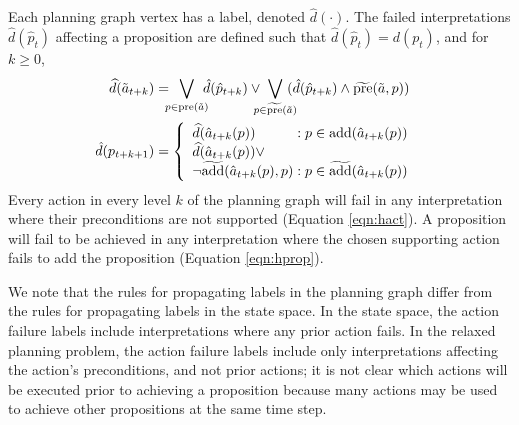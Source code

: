 \documentclass[letterpaper]{article}
\begin{document}
Each planning graph vertex has a label, denoted $\hat{d}(\cdot)$.  The failed
interpretations $\hat{d}(\hat{p}_t) $ affecting a proposition are defined such
that $\hat{d}(\hat{p}_t) = d(p_t)$, and for $k \geq 0$,
\begin{align}
\widehat{d}(\tilde{a}_{t+k}) &= \hspace*{-.2cm} 
\bigvee\limits_{p \in \text{pre}(\tilde{a}) } \hspace*{-.2cm}   \hat{d}(\hat{p}_{t+k}) \vee \hspace*{-.25cm} 
\bigvee\limits_{p \in \widetilde{\text{pre}}(\tilde{a})} \hspace*{-.25cm}  (\hat{d}(\hat{p}_{t+k})  \wedge  \widetilde{\text{pre}}(\tilde{a}, p) )\label{eqn:hact}\\
 \hspace*{-.6cm} \hat{d}(p_{t+k+1}) &= 
\left\{\begin{array}{l@{\;}l@{\;}r}
\widehat{d}(\hat{a}_{t+k}(p)) & : p \in \text{add}(\hat{a}_{t+k}(p))\\
\widehat{d}(\hat{a}_{t+k}(p)) \vee \\
\neg\widetilde{\text{add}}(\hat{a}_{t+k}(p), p) & : p \in \widetilde{\text{add}}(\hat{a}_{t+k}(p))\end{array}\right. \hspace*{-.1cm}\label{eqn:hprop}
\end{align}
\noindent Every action in every level $k$ of the planning graph will fail in any
interpretation where their preconditions are not supported (Equation
\ref{eqn:hact}).  A proposition will fail to be achieved in any interpretation
where the chosen supporting action fails to add the proposition (Equation
\ref{eqn:hprop}).

We note that the rules for propagating labels in the planning graph differ from
the rules for propagating labels in the state space.  In the state space, the
action failure labels include interpretations where any prior action fails.  In
the relaxed planning problem, the action failure labels include only
interpretations affecting the action's preconditions, and not prior actions; it
is not clear which actions will be executed prior to achieving a proposition
because many actions may be used to achieve other propositions at the same time
step.
\end{document}
